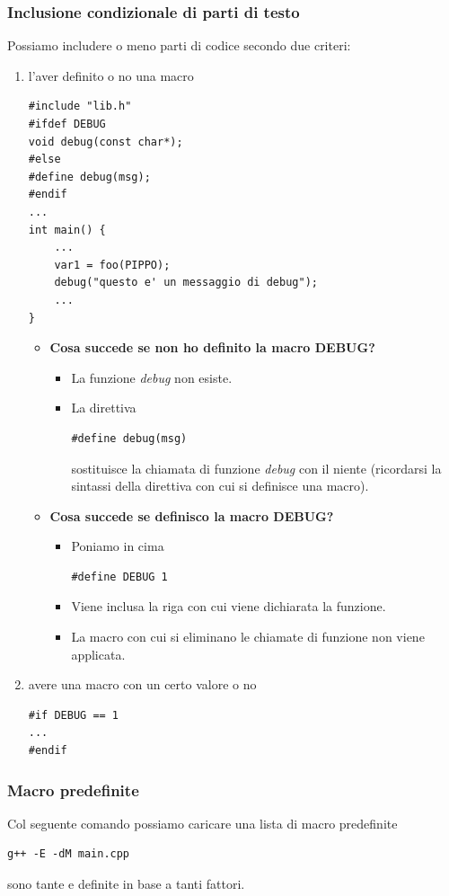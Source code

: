 \documentclass[11pt]{report}
\theoremstyle{definition}
\begin{document}
\subsubsection{Inclusione condizionale di parti di testo} Possiamo includere o meno parti di codice secondo due criteri:
\begin{enumerate}
\item l'aver definito o no una macro
\begin{verbatim}
#include "lib.h"
#ifdef DEBUG
void debug(const char*);
#else
#define debug(msg);
#endif
...
int main() {
    ... 
    var1 = foo(PIPPO);
    debug("questo e' un messaggio di debug");
    ...
}
\end{verbatim}
\begin{itemize}
\item \textbf{Cosa succede se non ho definito la macro DEBUG?}
\begin{itemize}
\item La funzione \emph{debug} non esiste.
\item La direttiva 
\begin{verbatim}
#define debug(msg)
\end{verbatim}
sostituisce la chiamata di funzione \emph{debug} con il niente (ricordarsi la sintassi della direttiva con cui si definisce una macro).
\end{itemize}
\item \textbf{Cosa succede se definisco la macro DEBUG?}
\begin{itemize}
\item Poniamo in cima
\begin{verbatim}
#define DEBUG 1
\end{verbatim}
\item Viene inclusa la riga con cui viene dichiarata la funzione.
\item La macro con cui si eliminano le chiamate di funzione non viene applicata.
\end{itemize}
\end{itemize}

\item avere una macro con un certo valore o no
\begin{verbatim}
#if DEBUG == 1
...
#endif
\end{verbatim}
\end{enumerate}
\subsubsection{Macro predefinite}
Col seguente comando possiamo caricare una lista di macro predefinite
\begin{verbatim}
g++ -E -dM main.cpp
\end{verbatim}
sono tante e definite in base a tanti fattori.
\end{document}
